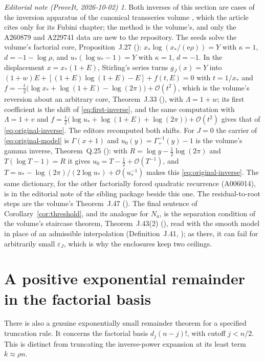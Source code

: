 \documentclass[11pt,letterpaper]{article}
\numberwithin{equation}{section}
\theoremstyle{remark}\newtheorem{remark}[theorem]{Remark}
\newtheorem*{ednote}{Editorial note (ProveIt, 2026-10-02)}
\newcommand{\e}{\mathrm e}
\newcommand{\Ord}{\mathcal O}
\begin{document}
\begin{ednote}
Both inverses of this section are cases of the inversion apparatus of the canonical transseries volume \cite{ed:tai}, which the article cites only for its Fubini chapter; the method is the volume's, and only the A260879 and A229741 data are new to the repository.
The seeds solve the volume's factorial core, Proposition~J.27 (): $x_*\log(x_*/(\e\rho))=Y$ with $\kappa=1$, $d=-1-\log\rho$, and $u_*(\log u_*-1)=Y$ with $\kappa=1$, $d=-1$.
In the displacement $x=x_*(1+E)$, Stirling's series turns $g_J(x)=Y$ into $(1+w)E+[(1+E)\log(1+E)-E]+f(t,E)=0$ with $t=1/x_*$ and $f=-\frac t2\bigl(\log x_*+\log(1+E)-\log(2\pi)\bigr)+\Ord(t^2)$, which is the volume's reversion about an arbitrary core, Theorem~J.33 (), with $\Lambda=1+w$; its first coefficient is the shift of \eqref{eq:first-inverse}, and the same computation with $\Lambda=1+v$ and $f=\frac t2\bigl(\log u_*+\log(1+E)+\log(2\pi)\bigr)+\Ord(t^2)$ gives that of \eqref{eq:original-inverse}. The editors recomputed both shifts.
For $J=0$ the carrier of \eqref{eq:original-model} is $\Gamma(x+1)$ and $u_0(y)=\Gamma_+^{-1}(y)-1$ is the volume's gamma inverse, Theorem~Q.25 (): with $R=\log y-\frac12\log(2\pi)$ and $T(\log T-1)=R$ it gives $u_0=T-\frac12+\Ord(T^{-1})$, and $T=u_*-\log(2\pi)/(2\log u_*)+\Ord(u_*^{-1})$ makes this \eqref{eq:original-inverse}. The same dictionary, for the other factorially forced quadratic recurrence (A006014), is in the editorial note of the sibling package  beside this one.
The residual-to-root steps are the volume's Theorem~J.47 (). The final sentence of Corollary~\ref{cor:threshold}, and its analogue for $N_a$, is the separation condition of the volume's staircase theorem, Theorem~J.43(2) (), read with the smooth model in place of an admissible interpolation (Definition~J.41, ); as there, it can fail for arbitrarily small $\varepsilon_J$, which is why the enclosures keep two ceilings.
\end{ednote}

\section{A positive exponential remainder in the factorial basis}
\label{sec:half}
There is also a genuine exponentially small remainder theorem for a specified truncation rule. It concerns the factorial basis $d_j(n-j)!$, with cutoff $j<n/2$. This is distinct from truncating the inverse-power expansion at its least term $k\approx\rho n$.
\end{document}
